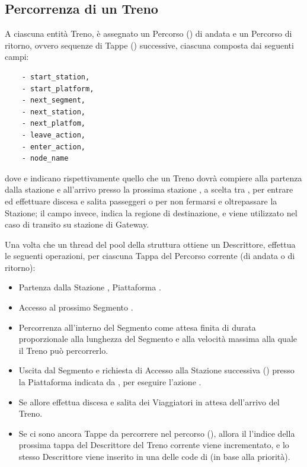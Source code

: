	\subsection{Percorrenza di un Treno}
	
	A ciascuna entità Treno, è assegnato un Percorso () di andata e un Percorso di ritorno, ovvero sequenze di Tappe () successive, ciascuna composta dai seguenti campi:
				\begin{center}
					\begin{verbatim}
    - start_station,
    - start_platform,
    - next_segment,
    - next_station,
    - next_platfom,
    - leave_action,
    - enter_action,
    - node_name
					\end{verbatim}
				\end{center}
dove  e  indicano rispettivamente quello che un Treno dovrà compiere alla partenza dalla stazione  e all'arrivo presso la prossima stazione , a scelta tra , per entrare ed effettuare discesa e salita passeggeri o  per non fermarsi e oltrepassare la Stazione; il campo  invece, indica la regione di destinazione, e viene utilizzato nel caso di transito su stazione di Gateway.

Una volta che un thread del pool della struttura  ottiene un Descrittore, effettua le seguenti  operazioni, per ciascuna Tappa del Percorso corrente (di andata o di ritorno):
				\begin{itemize} 
					\item Partenza dalla Stazione , Piattaforma .
					\item Accesso al prossimo Segmento .
					\item Percorrenza all'interno del Segmento come attesa finita di durata proporzionale alla lunghezza del Segmento e alla velocità massima alla quale il Treno può percorrerlo.
					\item Uscita dal Segmento e richiesta di Accesso alla Stazione successiva () presso la Piattaforma indicata da , per eseguire l'azione .
					\item Se  allore effettua discesa e salita dei Viaggiatori in attesa dell'arrivo del Treno.
					\item Se ci sono ancora Tappe da percorrere nel percorso (), allora il l'indice della prossima tappa del Descrittore del Treno corrente viene incrementato, e lo stesso Descrittore viene inserito in una delle code di  (in base alla priorità). 
				\end{itemize}

